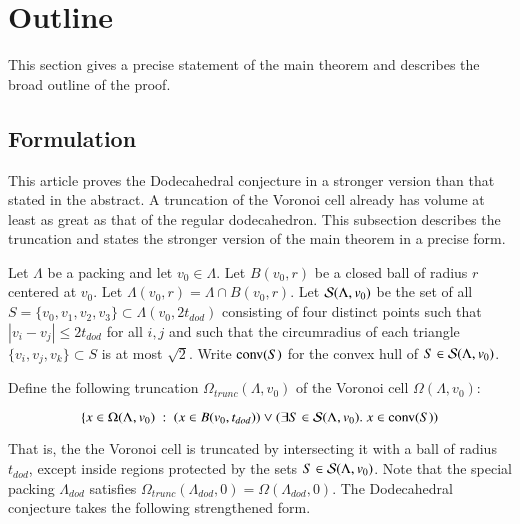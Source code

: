 \documentclass{article} %
\begin{document}
\section{Outline}

This section gives a precise statement of the main theorem
and describes the broad outline of the proof.

\subsection{Formulation}
\label{sec:form}

This article proves the Dodecahedral conjecture in a stronger
version than that stated in the abstract. A truncation of the Voronoi
cell already has volume at least as great as that of the regular
dodecahedron. This subsection describes the truncation and states the
stronger version of the main theorem in a precise form.

Let $\Lambda$ be a packing and let $v_0\in\Lambda$. Let $B(v_0,r)$ be
a closed ball of radius $r$ centered at $v_0$. Let $\Lambda(v_0,r) =
\Lambda\cap B(v_0,r)$. Let ${\mathcal S}(\Lambda,v_0)$ be the set of all
$S=\{v_0,v_1,v_2,v_3\}\subset\Lambda(v_0,2t_{dod})$ consisting of four
distinct points such that $|v_i-v_j|\le 2t_{dod}$ for all $i,j$ and
such that the circumradius of each triangle $\{v_i,v_j,v_k\}\subset S$
is at most $\sqrt2$. Write ${\operatorname{conv}}(S)$ for the convex hull of
$S\in{\mathcal S}(\Lambda,v_0)$.


Define the following truncation $\Omega_{trunc}(\Lambda,v_0)$ 
of the Voronoi cell $\Omega(\Lambda,v_0)$:

$$
\{x \in \Omega(\Lambda,v_0) \ :\  (x\in B(v_0,t_{dod})) \vee (\exists S\in {\mathcal S}(\Lambda,v_0).\ x \in {\operatorname{conv}}(S))
$$



That is, the the Voronoi cell is truncated by intersecting it with a
ball of radius $t_{dod}$, except inside regions protected by the sets
$S\in{\mathcal S}(\Lambda,v_0)$. Note that the special packing
$\Lambda_{dod}$ satisfies 
$\Omega_{trunc}(\Lambda_{dod},0) = \Omega(\Lambda_{dod},0)$. 
The Dodecahedral conjecture takes the following strengthened form.
\end{document}
